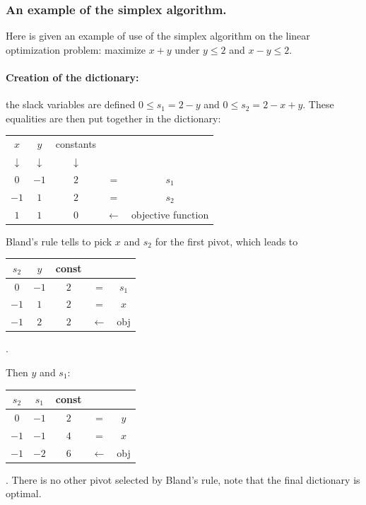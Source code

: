 \subsubsection{An example of the simplex algorithm.} Here is given an example of use of the simplex algorithm on the linear optimization problem: maximize $x+y$ under $y\leq 2$ and $x-y\leq 2$.
\vspace*{-0.4cm}
\begin{multicols}{2}
\paragraph{Creation of the dictionary:} the slack variables are defined $0 \leq s_1 = 2-y$ and $0\leq s_2=2-x+y$. These equalities are then put together in the dictionary:
\begin{tabular}{| c | c || c || c c |}
\hline	
$x$ & $y$ & constants & & \\
$\downarrow$ &$\downarrow$ &$\downarrow$ & & \\
\hline
\hline	
$0$ & $-1$ & $2$ & = & $s_1$\\ \hline	
$-1$ & $1$ & $2$ & = & $s_2$\\ \hline \hline	
$1$ & $1$ & $0$ & $\leftarrow$ & objective function \\
\hline	
\end{tabular}

Bland's rule tells to pick $x$ and $s_2$ for the first pivot, which leads to
\begin{tabular}{| c | c || c || c c |}
\hline
$s_2$ & $y$ & const & & \\
\hline
\hline	
$0$ & $-1$ & $2$ & = & $s_1$\\ \hline	
$-1$ & $1$ & $2$ & = & $x$\\ \hline \hline	
$-1$ & $2$ & $2$ & $\leftarrow$ & obj \\
\hline	
\end{tabular}.


Then $y$ and $s_1$: 
\begin{tabular}{| c | c || c || c c |}
\hline
$s_2$ & $s_1$ & const & & \\
\hline
\hline	
$0$ & $-1$ & $2$ & = & $y$\\ \hline	
$-1$ & $-1$ & $4$ & = & $x$\\ \hline \hline	
$-1$ & $-2$ & $6$ & $\leftarrow$ & obj \\
\hline	
\end{tabular}.
There is no other pivot selected by Bland's rule, note that the final dictionary is optimal.


\end{multicols}
